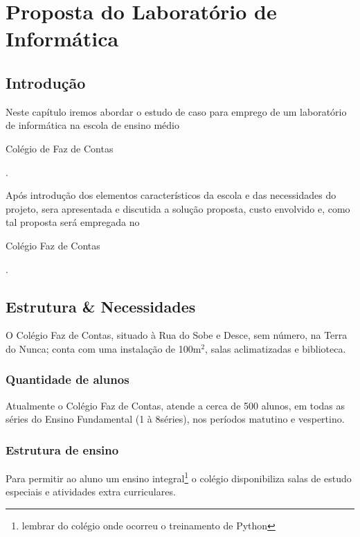 \documentclass[a4paper,12pt]{report}
\begin{document}
    \chapter[Laboratório]{Proposta do Laboratório de Informática}
    \label{ch:laboratorio}

        \section{Introdução}
        \label{sc:laboratorio_intro}
        Neste capítulo iremos abordar o estudo de caso para emprego de um
        laboratório de informática na escola de ensino médio
        \begin{bfseries}Colégio de Faz de Contas\end{bfseries}.

        Após introdução dos elementos característicos da escola e das
        necessidades do projeto, sera apresentada e discutida a solução
        proposta, custo envolvido e, como tal proposta será empregada no
        \begin{bfseries}Colégio Faz de Contas\end{bfseries}.

        \section{Estrutura \& Necessidades}
        \label{sc:laboratorio_estrutura}
        O Colégio Faz de Contas, situado à Rua do Sobe e Desce, sem
        número, na Terra do Nunca; conta com uma instalação de
        100m\begin{math}^{2}\end{math}, salas aclimatizadas e biblioteca.

            \subsection{Quantidade de alunos}
            Atualmente o Colégio Faz de Contas, atende a cerca de 500
            alunos, em todas as séries do Ensino Fundamental (1\textordfeminine
            à 8\textordfeminine séries), nos períodos matutino e vespertino.

            \subsection{Estrutura de ensino}
            Para permitir ao aluno um ensino integral\footnote{lembrar do
            colégio onde ocorreu o treinamento de Python} o colégio
            disponibiliza salas de estudo especiais e atividades extra
            curriculares.
\end{document}
